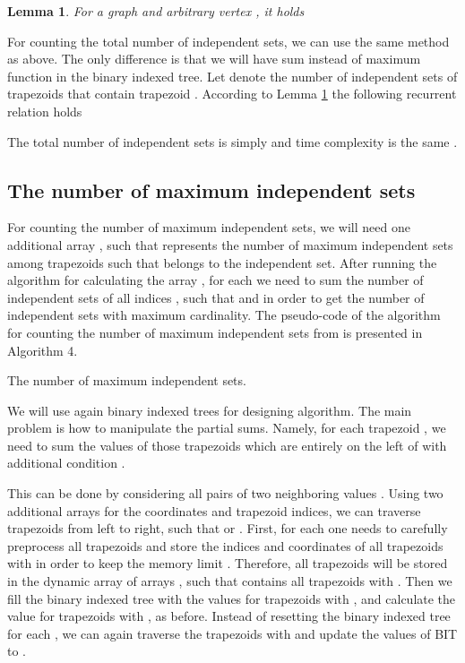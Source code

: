 \documentclass[11pt,letter]{article}
\newtheorem{lemma}[thm]{Lemma}
\begin{document}
\begin{lemma}
\label{le-1} For a graph  and arbitrary vertex , it holds

\end{lemma}


For counting the total number of independent sets, we can use the same method as above. The only
difference is that we will have sum instead of maximum function in the binary indexed tree. Let
 denote the number of independent sets of trapezoids  that contain trapezoid . According to Lemma \ref{le-1} the following recurrent relation
holds

The total number of independent sets is simply  and time complexity is the
same .


\subsection{The number of maximum independent sets}



For counting the number of maximum independent sets, we will need one additional array
, such that  represents the number of maximum independent sets
among trapezoids  such that  belongs to the
independent set. After running the algorithm for calculating the array , for each  we need to sum the number of independent sets of all indices , such that  and  in order to get the number of independent sets with
maximum cardinality. The pseudo-code of the algorithm for counting the number of maximum
independent sets from \cite{LiCh09} is presented in Algorithm 4.

\begin{algorithm}

    \;
    \For{ \KwTo }
    {
        \;
        \For{ \KwTo }
        {
            {
                \;
            }
        }
    }
    \Return \;

    \caption{ The number of maximum independent sets. }
\end{algorithm}


We will use again binary indexed trees for designing  algorithm. The main problem is
how to manipulate the partial sums. Namely, for each trapezoid , we need to sum the values
 of those trapezoids  which are entirely on the left of  with
additional condition .

This can be done by considering all pairs  of two neighboring values . Using two additional arrays for the coordinates and trapezoid indices, we can
traverse trapezoids  from left to right, such that  or . First, for each  one needs to carefully preprocess all
trapezoids and store the indices and coordinates of all trapezoids  with 
in order to keep the memory limit . Therefore, all trapezoids will be stored in the dynamic
array of arrays , such that  contains all trapezoids  with .
Then we fill the binary indexed tree with the values for trapezoids with , and
calculate the value  for trapezoids with , as before.
Instead of resetting the binary indexed tree for each , we can again traverse the trapezoids
with  and update the values of BIT to .
\end{document}
